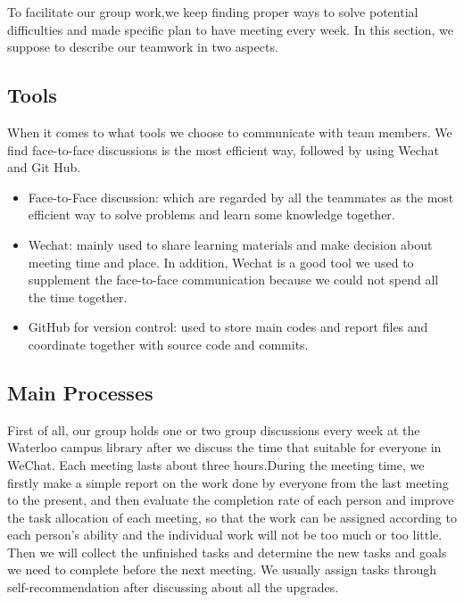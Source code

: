 \noindent To facilitate our group work,we keep finding proper ways to solve potential difficulties and made specific plan to have meeting every week. In this section, we suppose to describe our teamwork in two aspects.

\subsection{Tools}
\noindent When it comes to what tools we choose to communicate with team members. We find face-to-face discussions is the most efficient way, followed by using Wechat and Git Hub.
\begin{itemize}
    \item Face-to-Face discussion: which are regarded by all the teammates as the most efficient way to solve problems and learn some knowledge together.
    \item Wechat: mainly used to share learning materials and make decision about meeting time and place. In addition, Wechat is a good tool we used to supplement the face-to-face communication because we could not spend all the time together.
    \item GitHub for version control: used to store main codes and report files and coordinate together with source code and commits.
\end{itemize}
\vspace{0.3cm}

\subsection{Main Processes}

\noindent First of all, our group holds one or two group discussions every week at the Waterloo campus library after we discuss the time that suitable for everyone in WeChat. Each meeting lasts about three hours.During the meeting time, we firstly make a simple report on the work done by everyone from the last meeting to the present, and then evaluate the completion rate of each person and improve the task allocation of each meeting, so that the work can be assigned according to each person's ability and the individual work will not be too much or too little. Then we will collect the unfinished tasks and determine the new tasks and goals we need to complete before the next meeting. We usually assign tasks through self-recommendation after discussing about all the upgrades.
 
